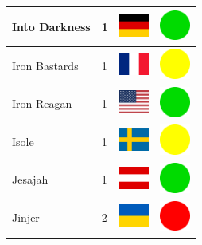 \documentclass[12pt, a4paper, twoside]{report}
\begin{document}
\begin{center}
\begin{longtable}{|p{5cm}|p{2cm}|p{2cm}|p{2cm}|}
			Into Darkness & 1 & \includegraphics[width=1cm]{4x3/de} & \includegraphics[width=1cm]{likes/y} \\ \hline
			Iron Bastards & 1 & \includegraphics[width=1cm]{4x3/fr} & \includegraphics[width=1cm]{likes/m} \\ \hline
			Iron Reagan & 1 & \includegraphics[width=1cm]{4x3/us} & \includegraphics[width=1cm]{likes/y} \\ \hline
			Isole & 1 & \includegraphics[width=1cm]{4x3/se} & \includegraphics[width=1cm]{likes/m} \\ \hline
			Jesajah & 1 & \includegraphics[width=1cm]{4x3/at} & \includegraphics[width=1cm]{likes/y} \\ \hline
			Jinjer & 2 & \includegraphics[width=1cm]{4x3/ua} & \includegraphics[width=1cm]{likes/n} \\ \hline

\end{longtable}
\end{center}
\end{document}
